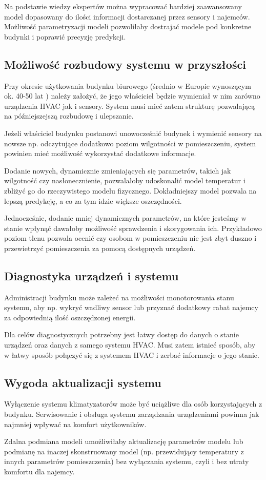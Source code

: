 Na podstawie wiedzy ekspertów można wypracować bardziej zaawansowany model dopasowany do ilości informacji dostarczanej przez sensory i najemców.
Możliwość parametryzacji modeli pozwoliłaby dostrajać modele pod konkretne budynki i poprawić precyzję predykcji.

\subsection*{Możliwość rozbudowy systemu w przyszłości}
Przy okresie użytkowania budynku biurowego (średnio w Europie wynoszącym ok. 40-50 lat \cite{bib:wiekBudynku}) należy założyć, że jego właściciel będzie wymieniał w nim zarówno urządzenia HVAC jak i sensory. System musi mieć zatem strukturę pozwalającą na późniejszejszą rozbudowę i ulepszanie. 

Jeżeli właściciel budynku postanowi unowocześnić budynek i wymienić sensory na nowsze np. odczytujące dodatkowo poziom wilgotności w pomieszczeniu, system powinien mieć możliwość wykorzystać dodatkowe informacje.

Dodanie nowych, dynamicznie zmieniających się parametrów, takich jak wilgotność czy nasłonecznienie, pozwalałoby udoskonalić model temperatur i zbliżyć go do rzeczywistego modelu fizycznego. Dokładniejszy model pozwala na lepszą predykcję, a co za tym idzie większe oszczędności.

Jednocześnie, dodanie mniej dynamicznych parametrów, na które jesteśmy w stanie wpłynąć dawałoby możliwość sprawdzenia i skorygowania ich. Przykładowo poziom tlenu pozwala ocenić czy osobom w pomieszczeniu nie jest zbyt duszno i przewietrzyć pomieszczenia za pomocą dostępnych urządzeń. 

\subsection*{Diagnostyka urządzeń i systemu}
Administracji budynku może zależeć na możliwości monotorowania stanu systemu, aby np. wykryć wadliwy sensor lub przyznać dodatkowy rabat najemcy za odpowiednią ilość oszczędzonej energii.

Dla celów diagnostycznych potrzebny jest łatwy dostęp do danych o stanie urządzeń oraz danych z samego systemu HVAC. Musi zatem istnieć sposób, aby w łatwy sposób połączyć się z systemem HVAC i zerbać informacje o jego stanie.

\subsection*{Wygoda aktualizacji systemu}
Wyłączenie systemu klimatyzatorów może być uciążliwe dla osób korzystających z budynku. 
Serwisowanie i obsługa systemu zarządzania urządzeniami powinna jak najmniej wpływać na komfort użytkowników.

Zdalna podmiana modeli umożliwiłaby aktualizację parametrów modelu lub podmianę na inaczej skonstruowany model (np. przewidujący temperatury z innych parametrów pomieszczenia) bez wyłączania systemu, czyli i bez utraty komfortu dla najemcy. 